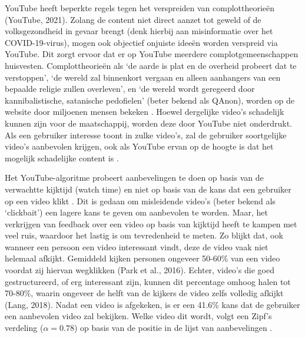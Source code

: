 \documentclass[../main.tex]{subfiles}
\begin{document}
YouTube heeft beperkte regels tegen het verspreiden van complottheorieën (YouTube, 2021). Zolang de content niet direct aanzet tot geweld of de volksgezondheid in gevaar brengt (denk hierbij aan misinformatie over het COVID-19-virus), mogen ook objectief onjuiste ideeën worden verspreid via YouTube. Dit zorgt ervoor dat er op YouTube meerdere complotgemeenschappen huisvesten. Complottheorieën als ‘de aarde is plat en de overheid probeert dat te verstoppen’, ‘de wereld zal binnenkort vergaan en alleen aanhangers van een bepaalde religie zullen overleven’, en ‘de wereld wordt geregeerd door kannibalistische, satanische pedofielen’ (beter bekend als QAnon), worden op de website door miljoenen mensen bekeken \citep{paolillo2018flat, miller2021characterizing}. Hoewel dergelijke video’s schadelijk kunnen zijn voor de maatschappij, worden deze door YouTube niet onderdrukt. Als een gebruiker interesse toont in zulke video’s, zal de gebruiker soortgelijke video’s aanbevolen krijgen, ook als YouTube ervan op de hoogte is dat het mogelijk schadelijke content is \citep{ledwich2019algorithmic}.

Het YouTube-algoritme probeert aanbevelingen te doen op basis van de verwachtte kijktijd (watch time) en niet op basis van de kans dat een gebruiker op een video klikt \citep{covington2016deep}. Dit is gedaan om misleidende video’s (beter bekend als ‘clickbait’) een lagere kans te geven om aanbevolen te worden. Maar, het verkrijgen van feedback over een video op basis van kijktijd heeft te kampen met veel ruis, waardoor het lastig is om tevredenheid te meten. Zo blijkt dat, ook wanneer een persoon een video interessant vindt, deze de video vaak niet helemaal afkijkt. Gemiddeld kijken personen ongeveer 50-60\% van een video voordat zij hiervan wegklikken (Park et al., 2016). Echter, video’s die goed gestructureerd, of erg interessant zijn, kunnen dit percentage omhoog halen tot 70-80\%, waarin ongeveer de helft van de kijkers de video zelfs volledig afkijkt (Lang, 2018). Nadat een video is afgekeken, is er een 41.6\% kans dat de gebruiker een aanbevolen video zal bekijken. Welke video dit wordt, volgt een Zipf’s verdeling ($\alpha = 0.78$) op basis van de positie in de lijst van aanbevelingen \citep{zhou2010impact}. 
\end{document}
